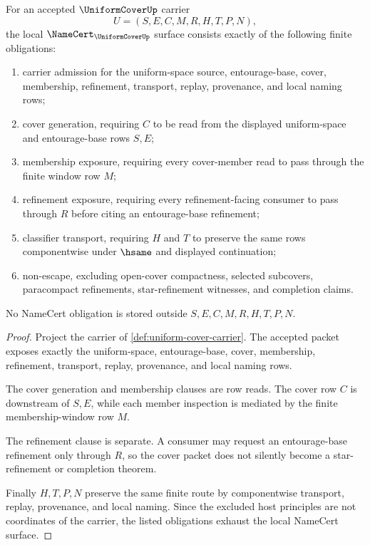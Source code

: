 \begin{theorem}
\label{thm:uniform-cover-namecert-obligations}
For an accepted $\UniformCoverUp$ carrier
$$
U=(S,E,C,M,R,H,T,P,N),
$$
the local $\NameCert_{\UniformCoverUp}$ surface consists exactly of the following finite obligations:
\begin{enumerate}
\item carrier admission for the uniform-space source, entourage-base, cover, membership, refinement, transport, replay, provenance, and local naming rows;
\item cover generation, requiring $C$ to be read from the displayed uniform-space and entourage-base rows $S,E$;
\item membership exposure, requiring every cover-member read to pass through the finite window row $M$;
\item refinement exposure, requiring every refinement-facing consumer to pass through $R$ before citing an entourage-base refinement;
\item classifier transport, requiring $H$ and $T$ to preserve the same rows componentwise under $\hsame$ and displayed continuation;
\item non-escape, excluding open-cover compactness, selected subcovers, paracompact refinements, star-refinement witnesses, and completion claims.
\end{enumerate}
No NameCert obligation is stored outside $S,E,C,M,R,H,T,P,N$.
\end{theorem}
\begin{proof}
Project the carrier of \autoref{def:uniform-cover-carrier}. The accepted packet exposes exactly the uniform-space, entourage-base, cover, membership, refinement, transport, replay, provenance, and local naming rows.

The cover generation and membership clauses are row reads. The cover row $C$ is downstream of $S,E$, while each member inspection is mediated by the finite membership-window row $M$.

The refinement clause is separate. A consumer may request an entourage-base refinement only through $R$, so the cover packet does not silently become a star-refinement or completion theorem.

Finally $H,T,P,N$ preserve the same finite route by componentwise transport, replay, provenance, and local naming. Since the excluded host principles are not coordinates of the carrier, the listed obligations exhaust the local NameCert surface.
\end{proof}

